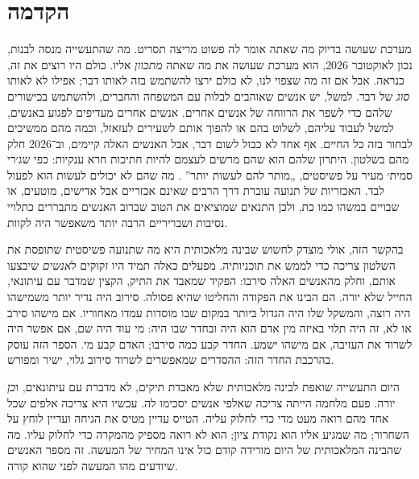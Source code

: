 \chapter*{הקדמה}
מערכת שעושה בדיוק מה שאתה אומר לה פשוט מריצה תסריט. מה שהתעשייה מנסה לבנות, נכון לאוקטובר 2026, הוא מערכת שעושה את מה שאתה \emph{מתכוון} אליו. כולם היו רוצים את זה, כנראה. אבל אם זה מה שצפוי לנו, לא כולם ירצו להשתמש בזה לאותו דבר; אפילו לא לאותו \emph{סוג} של דבר. למשל, יש אנשים שאוהבים לבלות עם המשפחה והחברים, ולהשתמש בכישורים שלהם כדי לשפר את הרווחה של אנשים אחרים. אנשים אחרים מעדיפים לפגוע באנשים, למשל לעבוד עליהם, לשלוט בהם או להפוך אותם לשעירים לעזאזל, וכמה מהם ממשיכים לבחור בזה כל החיים. אף אחד לא כבול לשום דבר, אבל האנשים האלה קיימים, וב־2026 חלק מהם בשלטון. היתרון שלהם הוא שהם מרשים לעצמם להיות חתיכות חרא ענקיות: כפי שג׳רי סמית׳ מעיר על פשיסטים, „מותר להם לעשות יותר” \autocite{rickandmorty2023}. מה שהם לא יכולים לעשות הוא לפעול לבד. האכזריות של תנועה עוברת דרך הרבים שאינם אכזריים אבל אדישים, מוטעים, או שבויים במשהו כמו כת, ולכן התנאים שמוציאים את הטוב שברוב האנשים מתבררים כתלויי נסיבות ושבריריים הרבה יותר משאפשר היה לקוות.

בהקשר הזה, אולי מוצדק לחשוש שבינה מלאכותית היא מה שתנועה פשיסטית שתופסת את השלטון צריכה כדי לממש את תוכניותיה. מפעלים כאלה תמיד היו זקוקים ל\emph{אנשים} שיבצעו אותם, וחלק מהאנשים האלה סירבו: הפקיד שמאבד את התיק, הקצין שמדבר עם עיתונאי, החייל שלא יורה. הם הבינו את הפקודה והחליטו שהיא פסולה. סירוב היה נדיר יותר משמישהו היה רוצה, והמשקל שלו היה הגדול ביותר במקום שבו מוסדות עמדו מאחוריו. אם מישהו סירב או לא, זה היה תלוי באיזה מין אדם הוא היה ובחדר שבו היה: מי עוד היה שם, אם אפשר היה לשרוד את העזיבה, אם מישהו ישמע. החדר קבע כמה סירבו; האדם קבע מי. הספר הזה עוסק בהרכבת החדר הזה: ההסדרים שמאפשרים לשרוד סירוב גלוי, ישיר ומפורש.

היום התעשייה שואפת לבינה מלאכותית שלא מאבדת תיקים, לא מדברת עם עיתונאים, ו\emph{כן} יורה. פעם מלחמה הייתה צריכה שאלפי אנשים יסכימו לה. עכשיו היא צריכה אלפים שכל אחד מהם רואה מעט מדי כדי לחלוק עליה. הטייס עדיין מטיס את הגיחה ועדיין לוחץ על השחרור; מה שמגיע אליו הוא נקודת ציון; הוא לא רואה מספיק מהמקרה כדי לחלוק עליו. מה שהבינה המלאכותית של היום מורידה קודם כול אינו המחיר של המעשה. זה מספר האנשים שיודעים מהו המעשה לפני שהוא קורה.

